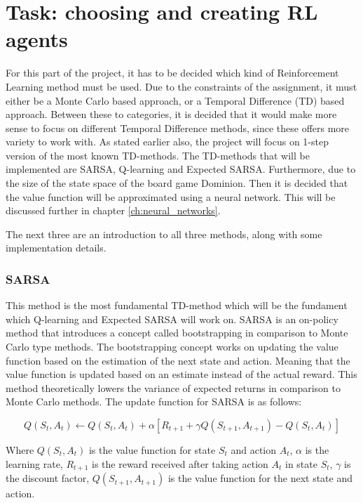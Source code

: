 \chapter{Task: choosing and creating RL agents} \label{ch:RL_methods}

For this part of the project, it has to be decided which kind of Reinforcement Learning method must be used. Due to the constraints of the assignment, it must either be a Monte Carlo based approach, or a Temporal Difference (TD) based approach. Between these to categories, it is decided that it would make more sense to focus on different Temporal Difference methods, since these offers more variety to work with. As stated earlier also, the project will focus on 1-step version of the most known TD-methods. The TD-methods that will be implemented are SARSA, Q-learning and Expected SARSA.
Furthermore, due to the size of the state space of the board game Dominion. Then it is decided that the value function will be approximated using a neural network. This will be discussed further in chapter \ref{ch:neural_networks}.

The next three are an introduction to all three methods, along with some implementation details.

\subsection{SARSA}
This method is the most fundamental TD-method which will be the fundament which Q-learning and Expected SARSA will work on. SARSA is an on-policy method that introduces a concept called bootstrapping in comparison to Monte Carlo type methods. The bootstrapping concept works on updating the value function based on the estimation of the next state and action. Meaning that the value function is updated based on an estimate instead of the actual reward. This method theoretically lowers the variance of expected returns in comparison to Monte Carlo methods. The update function for SARSA is as follows:

\begin{equation}
    Q(S_t, A_t) \leftarrow Q(S_t, A_t) + \alpha \left[ R_{t+1} + \gamma Q(S_{t+1}, A_{t+1}) - Q(S_t, A_t) \right]
\end{equation}

Where $Q(S_t, A_t)$ is the value function for state $S_t$ and action $A_t$, $\alpha$ is the learning rate, $R_{t+1}$ is the reward received after taking action $A_t$ in state $S_t$, $\gamma$ is the discount factor, $Q(S_{t+1}, A_{t+1})$ is the value function for the next state and action.

